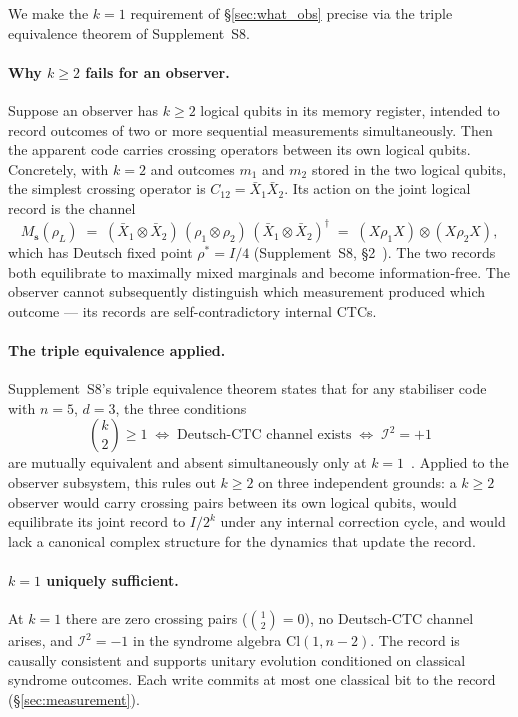 \documentclass[11pt,a4paper]{article}
\providecommand{\Cl}[1]{\mathrm{Cl}(#1)}
\newcommand{\Ms}{M_{\mathbf{s}}}
\begin{document}
We make the $k=1$ requirement of \S\ref{sec:what_obs} precise via the triple equivalence theorem of Supplement~S8.

\paragraph{Why $k\geq2$ fails for an observer.}
Suppose an observer has $k\geq2$ logical qubits in its memory register, intended to record outcomes of two or more sequential measurements simultaneously. Then the apparent code carries crossing operators between its own logical qubits. Concretely, with $k=2$ and outcomes $m_1$ and $m_2$ stored in the two logical qubits, the simplest crossing operator is $C_{12}=\bar X_1\bar X_2$. Its action on the joint logical record is the channel
\begin{equation}
  \Ms(\rho_L)
  \;=\; (\bar X_1\otimes\bar X_2)\,(\rho_1\otimes\rho_2)\,
        (\bar X_1\otimes\bar X_2)^\dagger
  \;=\; (X\rho_1 X)\otimes(X\rho_2 X),
\end{equation}
which has Deutsch fixed point $\rho^*=I/4$ (Supplement~S8, \S2~\cite{Hubka2026QSDSupp}). The two records both equilibrate to maximally mixed marginals and become information-free. The observer cannot subsequently distinguish which measurement produced which outcome --- its records are self-contradictory internal CTCs.

\paragraph{The triple equivalence applied.}
Supplement~S8's triple equivalence theorem states that for any stabiliser code with $n=5$, $d=3$, the three conditions
\[
  \binom{k}{2}\geq 1
  \;\Longleftrightarrow\;
  \text{Deutsch-CTC channel exists}
  \;\Longleftrightarrow\;
  \mathcal{I}^2=+1
\]
are mutually equivalent and absent simultaneously only at $k=1$~\cite{Hubka2026QSDSupp}. Applied to the observer subsystem, this rules out $k\geq2$ on three independent grounds: a $k\geq2$ observer would carry crossing pairs between its own logical qubits, would equilibrate its joint record to $I/2^k$ under any internal correction cycle, and would lack a canonical complex structure for the dynamics that update the record.

\paragraph{$k=1$ uniquely sufficient.}
At $k=1$ there are zero crossing pairs ($\binom{1}{2}=0$), no Deutsch-CTC channel arises, and $\mathcal{I}^2=-1$ in the syndrome algebra $\Cl{1,n-2}$. The record is causally consistent and supports unitary evolution conditioned on classical syndrome outcomes. Each write commits at most one classical bit to the record (\S\ref{sec:measurement}).
\end{document}
